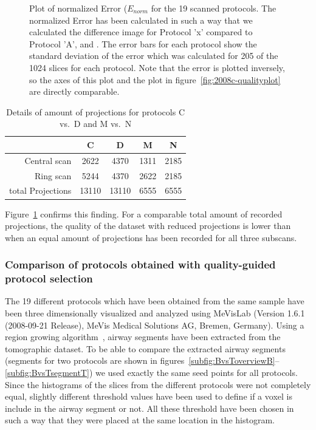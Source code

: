 \begin{figure}
	\centering
	
	\caption{Plot of normalized Error ($E_{norm}$ for the 19 scanned protocols. The normalized Error has been calculated in such a way that we calculated the difference image for Protocol 'x' compared to Protocol 'A',  and . The error bars for each protocol show the standard deviation of the error which was calculated for 205 of the 1024 slices for each protocol. Note that the error is plotted inversely, so the axes of this plot and the plot in figure~\ref{fig:2008c-qualityplot} are directly comparable.}
	\label{fig:NormalizedErrorPlot}
\end{figure}

\begin{table}%
	\centering
	\caption{Details of amount of projections for protocols C vs.\ D and M vs.\ N}%
	\begin{tabular}{rcccc}%
		\toprule%
							& C 	& D 	& M 	& N \\%
		\midrule%
		Central scan		& 2622 	& 4370	& 1311 	& 2185 \\%
		Ring scan	 		& 5244 	& 4370  & 2622 	& 2185 \\%
		\midrule%
		total Projections	& 13110	& 13110	& 6555	& 6555 \\%
		\bottomrule%
	\end{tabular}%
	\label{tab:detailsCDMN}%
\end{table}

Figure~\ref{fig:NormalizedErrorPlot} confirms this finding. For a comparable total amount of recorded projections, the quality of the dataset with reduced projections is lower than when an equal amount of projections has been recorded for all three subscans.

\subsubsection{Comparison of protocols obtained with quality-guided protocol selection}
\label{subsec:comparison}
The 19 different protocols which have been obtained from the same sample have been three dimensionally visualized and analyzed using MeVisLab (Version 1.6.1 (2008-09-21 Release), MeVis Medical Solutions AG, Bremen, Germany). Using a region growing algorithm~\cite{wiki:regiongrowing}, airway segments have been extracted from the tomographic dataset. To be able to compare the extracted airway segments (segments for two protocols are shown in figures~\ref{subfig:BvsToverviewB}--\ref{subfig:BvsTsegmentT}) we used exactly the same seed points for all protocols. Since the histograms of the slices from the different protocols were not completely equal, slightly different threshold values have been used to define if a voxel is include in the airway segment or not. All these threshold have been chosen in such a way that they were placed at the same location in the histogram.

